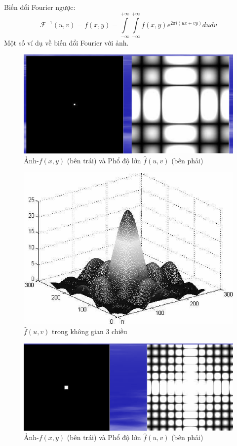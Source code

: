 \documentclass[12pt,a4paper]{report}
\numberwithin{equation}{section}
\theoremstyle{definition} %
\begin{document}
Biến đổi Fourier ngược:
\begin{equation}
\mathcal{F}^{-1}(u,v) =f(x,y)= \int\limits_{-\infty}^{+\infty}\int\limits_{-\infty}^{+\infty}f(x,y)e^{2\pi i(ux+vy)}dudv
\end{equation}
Một số ví dụ về biến đổi Fourier với ảnh.
		 \begin{figure}[H]
			\centering
			\includegraphics[width = 0.8\linewidth]{img/anhVaphodolon1.png}
			\caption{Ảnh-$f(x,y)$ (bên trái) và Phổ độ lớn $\hat{f}(u,v)$ (bên phải)}
			\label{fig14}
		 \end{figure}
		 \begin{figure}[H]
			\centering
			\includegraphics[width = 0.8\linewidth]{img/anhVaphodolon1-3d.png}
			\caption{$\hat{f}(u,v)$ trong không gian 3 chiều}
			\label{fig15}
		 \end{figure}
		  \begin{figure}[H]
			\centering
			\includegraphics[width = 0.8\linewidth]{img/anhVaphodolon2.png}
			\caption{Ảnh-$f(x,y)$ (bên trái) và Phổ độ lớn $\hat{f}(u,v)$ (bên phải)}
			\label{fig16}
		 \end{figure}
\end{document}
